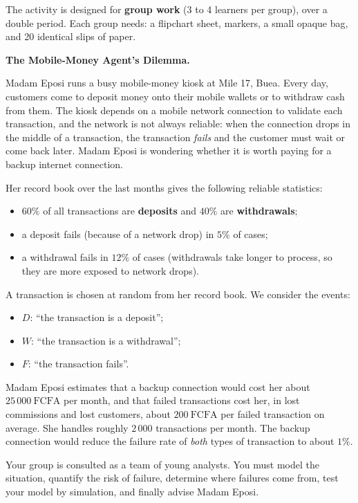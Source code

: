 \documentclass[11pt]{article}
\newcounter{popsec}
\newcounter{popsub}
\newcommand{\courssub}[1]{%
  \stepcounter{popsub}%
  \par\vspace{9pt}\noindent{\popxbold\fontsize{11.5}{13}\selectfont\color{popink}{\color{poporange}\thepopsec.\thepopsub}\hspace{6pt}#1}\par\nopagebreak\vspace{4pt}
}
\begin{document}
The activity is designed for \textbf{group work} (3 to 4 learners per group), over a double period. Each group needs: a flipchart sheet, markers, a small opaque bag, and 20 identical slips of paper.

\courssub{Situation}

\textbf{The Mobile-Money Agent's Dilemma.}\par
Madam Eposi runs a busy mobile-money kiosk at Mile 17, Buea. Every day, customers come to deposit money onto their mobile wallets or to withdraw cash from them. The kiosk depends on a mobile network connection to validate each transaction, and the network is not always reliable: when the connection drops in the middle of a transaction, the transaction \emph{fails} and the customer must wait or come back later. Madam Eposi is wondering whether it is worth paying for a backup internet connection.

Her record book over the last months gives the following reliable statistics:

\begin{itemize}
\item $60\%$ of all transactions are \textbf{deposits} and $40\%$ are \textbf{withdrawals};
\item a deposit fails (because of a network drop) in $5\%$ of cases;
\item a withdrawal fails in $12\%$ of cases (withdrawals take longer to process, so they are more exposed to network drops).
\end{itemize}

A transaction is chosen at random from her record book. We consider the events:
\begin{itemize}
\item $D$: ``the transaction is a deposit'';
\item $W$: ``the transaction is a withdrawal'';
\item $F$: ``the transaction fails''.
\end{itemize}

Madam Eposi estimates that a backup connection would cost her about $25\,000\ \mathrm{FCFA}$ per month, and that failed transactions cost her, in lost commissions and lost customers, about $200\ \mathrm{FCFA}$ per failed transaction on average. She handles roughly $2\,000$ transactions per month. The backup connection would reduce the failure rate of \emph{both} types of transaction to about $1\%$.

Your group is consulted as a team of young analysts. You must model the situation, quantify the risk of failure, determine where failures come from, test your model by simulation, and finally advise Madam Eposi.
\end{document}
